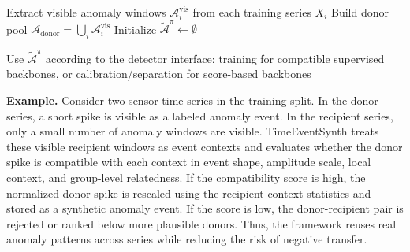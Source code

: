 \documentclass[conference]{IEEEtran}
\begin{document}
\begin{algorithm}[t]
\caption{Compatibility-Aware Cross-Series Event Augmentation}
\label{alg:cross-series-augmentation}

Extract visible anomaly windows $\mathcal{A}^{\mathrm{vis}}_i$ from each training series $X_i$\;
Build donor pool $\mathcal{A}_{\mathrm{donor}}=\bigcup_i\mathcal{A}^{\mathrm{vis}}_i$\;
Initialize $\widetilde{\mathcal{A}}^\pi\leftarrow\emptyset$\;


Use $\widetilde{\mathcal{A}}^\pi$ according to the detector interface: training for compatible supervised backbones, or calibration/separation for score-based backbones\;
\end{algorithm}

\noindent\textbf{Example.}
Consider two sensor time series in the training split. In the donor series, a
short spike is visible as a labeled anomaly event. In the recipient series,
only a small number of anomaly windows are visible. TimeEventSynth treats these
visible recipient windows as event contexts and evaluates whether the donor
spike is compatible with each context in event shape, amplitude scale, local context, and group-level relatedness. If the compatibility score is high, the
normalized donor spike is rescaled using the recipient context statistics and
stored as a synthetic anomaly event. If the score is low, the donor-recipient
pair is rejected or ranked below more plausible donors. Thus, the framework
reuses real anomaly patterns across series while reducing the risk of negative
transfer.
\end{document}
